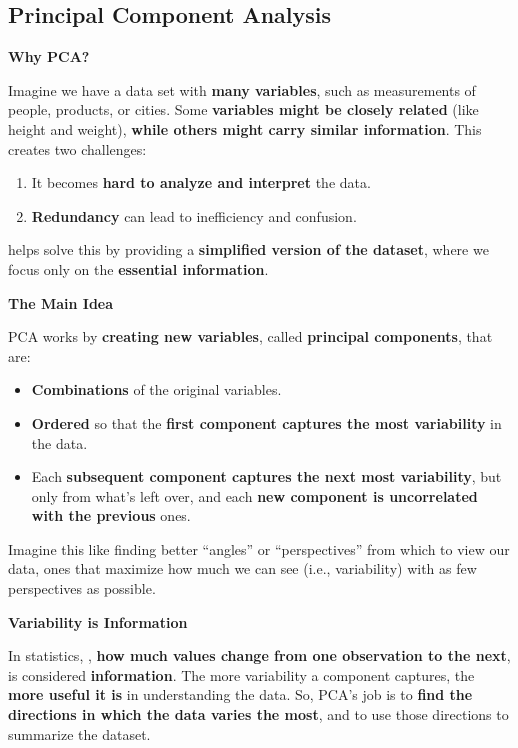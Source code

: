 \subsection{Principal Component Analysis}

\begin{flushleft}
    \textcolor{Green3}{ \textbf{Why PCA?}}
\end{flushleft}
Imagine we have a data set with \textbf{many variables}, such as measurements of people, products, or cities. Some \textbf{variables might be closely related} (like height and weight), \textbf{while others might carry similar information}. This creates two challenges:
\begin{enumerate}
    \item It becomes \textbf{hard to analyze and interpret} the data.
    \item \textbf{Redundancy} can lead to inefficiency and confusion.
\end{enumerate}
 helps solve this by providing a \textbf{simplified version of the dataset}, where we focus only on the \textbf{essential information}.

\highspace
\begin{flushleft}
    \textcolor{Green3}{ \textbf{The Main Idea}}
\end{flushleft}
PCA works by \textbf{creating new variables}, called \textbf{principal components}, that are:
\begin{itemize}
    \item \textbf{Combinations} of the original variables.
    \item \textbf{Ordered} so that the \textbf{first component captures the most variability} in the data.
    \item Each \textbf{subsequent component captures the next most variability}, but only from what's left over, and each \textbf{new component is uncorrelated with the previous} ones.
\end{itemize}
Imagine this like finding better ``angles'' or ``perspectives'' from which to view our data, ones that maximize how much we can see (i.e., variability) with as few perspectives as possible.

\highspace
\begin{flushleft}
    \textcolor{Green3}{ \textbf{Variability is Information}}
\end{flushleft}
In statistics, , \textbf{how much values change from one observation to the next}, is considered \textbf{information}. The more variability a component captures, the \textbf{more useful it is} in understanding the data. So, PCA's job is to \textbf{find the directions in which the data varies the most}, and to use those directions to summarize the dataset.


